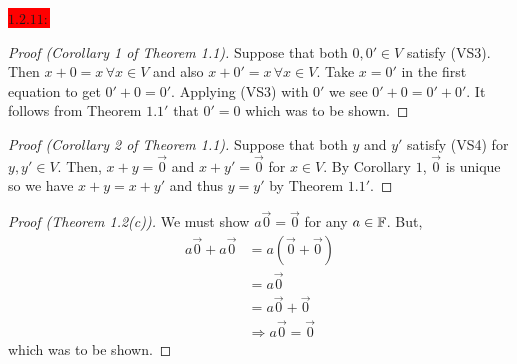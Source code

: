 \documentclass{exam}
\begin{document}
  \colorbox{red}{\underline{$1.2.11:$}}
  \begin{solution}
    \begin{proof}[Proof (Corollary 1 of Theorem 1.1)]
      Suppose that both ${0}, {0'} \in V$ satisfy (VS3). Then ${x} + {0} = x \,\forall {x} \in V$ and also ${x} + {0'} = x \,\forall {x} \in V$. Take ${x} = {0'}$ in the first equation to get ${0'} + {0} = {0'}$. Applying (VS3) with ${0'}$ we see ${0'} + {0} = {0'} + {0'}$. It follows from Theorem $1.1'$ that ${0'} = {0}$ which was to be shown.
    \end{proof}

    \begin{proof}[Proof (Corollary 2 of Theorem 1.1)]
      Suppose that both $y$ and $y'$ satisfy (VS4) for $y, y' \in V$. Then, $x + y = \vec{0}$ and $x + y' = \vec{0}$ for $x \in V$. By Corollary $1$, $\vec{0}$ is unique so we have $x + y = x + y'$ and thus $y = y'$ by Theorem $1.1'$.
    \end{proof}

    \begin{proof}[Proof (Theorem 1.2(c))]
      We must show $a\vec{0} = \vec{0}$ for any $a \in \mathbb F$. But, 
      \begin{align*}
        a\vec{0} + a\vec{0} &= a(\vec{0} + \vec{0}) \tag*{(VS7)} \\
        &= a\vec{0} \tag*{(VS3)} \\
        &= a\vec{0} + \vec{0} \tag*{(VS3)} \\
        &\Rightarrow a\vec{0} = \vec{0} \tag*{(Thm1.1')}
      \end{align*}
      which was to be shown.
    \end{proof}
  \end{solution}
\end{document}
